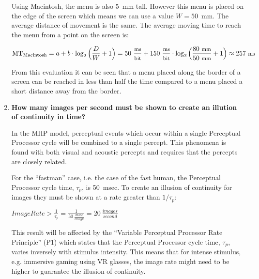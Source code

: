 \begin{enumerate}
Using Macintosh, the menu is also 5~mm tall. However this menu is placed on the edge of the screen which means we can use a value $W = 50$~mm. The average distance of movement is the same. The average moving time to reach the menu from a point on the screen is:

\begin{displaymath}
\text{MT}_\text{Macintosh} = a + b \cdot \log_2\Big(\frac{D}{W} + 1\Big) = 50~{\footnotesize \frac{\text{ms}}{\text{bit}}} + 150~{\footnotesize \frac{\text{ms}}{\text{bit}}} \cdot \log_2\Big(\frac{80~\text{\footnotesize mm}}{50~\text{\footnotesize mm}} + 1\Big) \approx 257~\text{\footnotesize ms}
\end{displaymath}

From this evaluation it can be seen that a menu placed along the border of a screen can be reached in less than half the time compared to a menu placed a short distance away from the border.

\item \textbf{How many images per second must be shown to create an illution of continuity in time?}

In the \ac{MHP} model, perceptual events which occur within a single Perceptual Processor cycle will be combined to a single percept. This phenomena is found with both visual and acoustic percepts and requires that the percepts are closely related.

For the ``fastman'' case, i.e. the case of the fast human, the Perceptual Processor cycle time, $\tau_p$, is 50~msec. To create an illusion of continuity for images they must be shown at a rate greater than $1 / \tau_p$:

$\textit{ImageRate} > \frac{1}{\tau_p} = \frac{1}{50~\frac{\textit{msec}}{\textit{image}}} = 20~\frac{\textit{images}}{\textit{second}}$

This result will be affected by the ``Variable Perceptual Processor Rate Principle'' (P1) which states that the Perceptual Processor cycle time, $\tau_p$, varies inversely with stimulus intensity. This means that for intense stimulus, e.g. immersive gaming using \ac{VR} glasses, the image rate might need to be higher to guarantee the illusion of continuity.

\end{enumerate}



